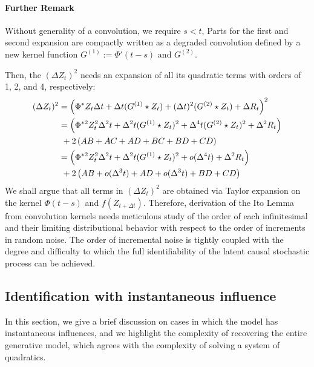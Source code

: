\documentclass[10pt]{article}
\numberwithin{figure}{section}
\begin{document}
\paragraph{Further Remark}  Without generality of a convolution, we require $s<t$, Parts for the first and second expansion are compactly written as a degraded convolution defined by a new kernel function $G^{(1)}:=\Phi'(t-s)$ and $G^{(2)}$.  

Then, the $(\Delta Z_t)^2$ needs an expansion of all its quadratic terms with orders of 1, 2, and 4, respectively:
\begin{align}
    (\Delta Z_t)^2&=\left(\Phi^{*}Z_t\Delta t+\Delta t(G^{(1)}\star Z_t)+(\Delta t)^2(G^{(2)}\star Z_t)+\Delta R_t\right)^2 \notag\\
    &=\left( \Phi^{*2}Z_t^2\Delta^2t + \Delta^2 t(G^{(1)}\star Z_t)^2+\Delta^4 t(G^{(2)}\star Z_t)^2+\Delta ^2R_t\right) \notag\\
    & ~ + 2\left(AB+AC+AD+BC+BD+CD\right) \notag\\
    &=\left( \Phi^{*2}Z_t^2\Delta^2t + \Delta^2 t(G^{(1)}\star Z_t)^2+o(\Delta^4 t)+\Delta ^2R_t\right)\\
    & ~ +2\left(AB+o(\Delta^3 t)+AD+o(\Delta^3 t)+BD+CD\right)
\end{align}
We shall argue that all terms in $(\Delta Z_t)^2$  are obtained via Taylor expansion on the kernel $\Phi(t-s)$ and $f(Z_{t+\Delta t})$.  Therefore, derivation of the Ito Lemma from convolution kernels needs meticulous study of the order of each infinitesimal and their limiting distributional behavior with respect to the order of increments in random noise.   The order of incremental noise is tightly coupled with the degree and difficulty to which the full identifiability of the latent causal stochastic process can be achieved. 
\subsection{Identification with instantaneous influence}

In this section, we give a brief discussion on cases in which the model has instantaneous influences, and we highlight the complexity of  recovering the entire generative model, which agrees with the complexity of solving a system of quadratics.
\end{document}
